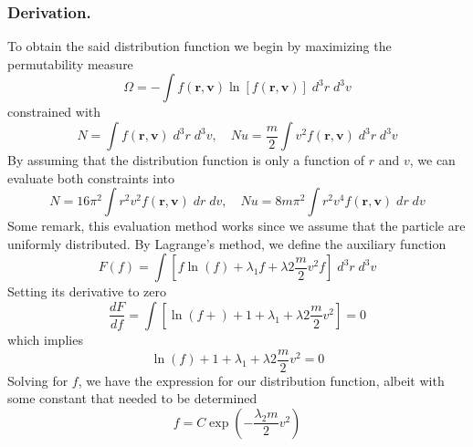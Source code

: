 \documentclass[../../../Main.tex]{subfiles}
\begin{document}
\subsubsection{Derivation.} To obtain the said distribution function we begin by maximizing the permutability measure
\begin{equation*}
    \Omega=-\int f(\mathbf{r},\mathbf{v})\ln [f(\mathbf{r},\mathbf{v})]\;d^3r\;d^3v
\end{equation*}
constrained with 
\begin{equation*}
    N=\int f(\mathbf{r},\mathbf{v})\;d^3r\;d^3v,\quad Nu=\frac{m}{2}\int  v^2f(\mathbf{r},\mathbf{v})\;d^3r\;d^3v
\end{equation*}
By assuming that the distribution function is only a function of $r$ and $v$, we can evaluate both constraints into
\begin{equation*}
    N=16\pi^2\int r^2v^2 f(\mathbf{r},\mathbf{v})\;dr\;dv,\quad Nu=8m\pi^2\int r^2v^4f(\mathbf{r},\mathbf{v})\;dr\;dv
\end{equation*}
Some remark, this evaluation method works since we assume that the particle are uniformly distributed. By Lagrange's method, we define the auxiliary function
\begin{equation*}
    F(f)=\int \left[f\ln (f)+ \lambda_1f+\lambda2\frac{m}{2}v^2f\right] \;d^3r\;d^3v
\end{equation*}
Setting its derivative to zero 
\begin{equation*}
    \frac{dF}{df} = \int \left[\ln(f+) +1 + \lambda_1 +\lambda2\frac{m}{2}v^2\right] =0
\end{equation*}
which implies
\begin{equation*}
    \ln(f) +1 + \lambda_1 +\lambda2\frac{m}{2}v^2=0
\end{equation*}
Solving for $f$, we have the expression for our distribution function, albeit with some constant that needed to be determined
\begin{equation*}
    f=C\exp\left(- \frac{\lambda_2m}{2}v^2\right)
\end{equation*}
\end{document}
